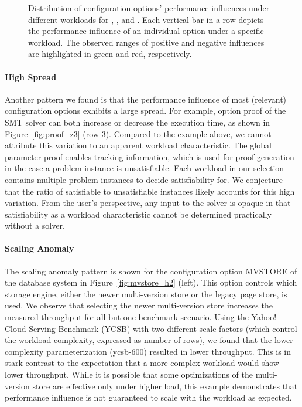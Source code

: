 {{{{\begin{figure}[ht!]
	\caption{Distribution of configuration options' performance influences under different workloads for \jumper, \zdrei, and \htwo. Each vertical bar in a row depicts the performance influence of an individual option under a specific workload. The observed ranges of positive and negative influences are highlighted in green and red, respectively.}
	\label{fig:three_systems}
\end{figure}

\paragraph{High Spread} Another pattern we found is that the performance influence of most (relevant) configuration options exhibits a large spread. For example, option \textsf{proof} of the SMT solver \zdrei can both increase or decrease the execution time, as shown in Figure~\ref{fig:proof_z3} (row 3). Compared to the example above, we cannot attribute this variation to an apparent workload characteristic.
The global parameter \textsf{proof} enables tracking information, which is used for proof generation in the case a problem instance is unsatisfiable. Each workload in our selection contains multiple problem instances to decide satisfiability for. We conjecture that the ratio of satisfiable to unsatisfiable instances likely accounts for this high variation. From the user's perspective, any input to the solver is opaque in that satisfiability as a workload characteristic cannot be determined practically without a solver. 
\paragraph{Scaling Anomaly} The scaling anomaly pattern is shown for the configuration option \textsf{MVSTORE} of the database system \htwo in Figure~\ref{fig:mvstore_h2} (left). This option controls which storage engine, either the newer multi-version store or the legacy page store, is used. We observe that selecting the newer multi-version store increases the measured throughput for all but one benchmark scenario. 
Using the Yahoo! Cloud Serving Benchmark (YCSB) with two different scale factors (which control the workload complexity, expressed as number of rows), we found that the lower complexity parameterization (\textsf{ycsb-600}) resulted in lower throughput. 	This is in stark contrast to the expectation that a more complex workload would show lower throughput. While it is possible that some optimizations of the multi-version store are effective only under higher load, this example demonstrates that performance influence is not guaranteed to scale with the workload as expected. 

}}}}
